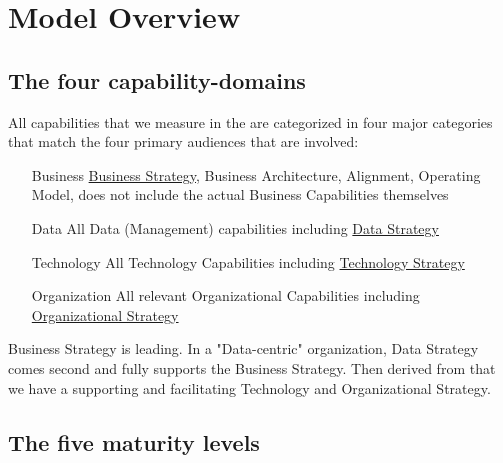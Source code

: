 \section{Model Overview}\label{sec:model-overview}

\subsection{The four capability-domains}\label{subsec:the-four-capability-domains}

All capabilities that we measure in the  are categorized in four major categories that match the four primary audiences that are involved:

\begin{enumerate}[leftmargin=1in,font=\bfseries]
    \item [Business]     \ul{Business Strategy}, Business Architecture, Alignment, Operating Model, does not include the actual Business Capabilities themselves
    \item [Data]         All Data (Management) capabilities including \ul{Data Strategy}
    \item [Technology]   All Technology Capabilities including \ul{Technology Strategy}
    \item [Organization] All relevant Organizational Capabilities including \ul{Organizational Strategy}
\end{enumerate}

Business Strategy is leading.
In a "Data-centric" organization, Data Strategy comes second and fully supports the Business Strategy.
Then derived from that we have a supporting and facilitating Technology and Organizational Strategy.

\subsection{The five maturity levels}\label{subsec:the-five-maturity-levels}









